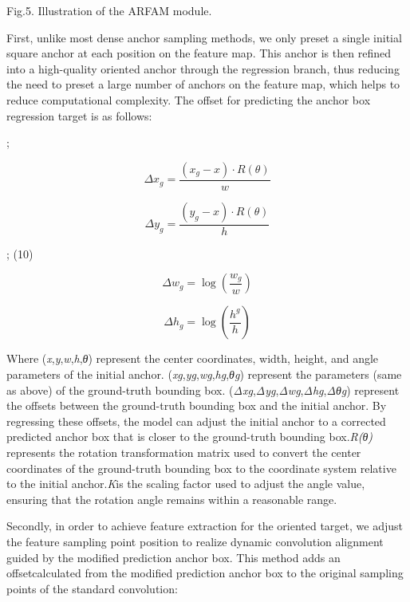 \documentclass[journal]{IEEEtran}
\begin{document}
Fig.5. Illustration of the ARFAM module.

First, unlike most dense anchor sampling methods, we only preset a single initial square anchor at each position on the feature map. This anchor is then refined into a high-quality oriented anchor through the regression branch, thus reducing the need to preset a large number of anchors on the feature map, which helps to reduce computational complexity. The offset for predicting the anchor box regression target is as follows:

 ; 

\begin{equation}
\Delta x_g = \frac{(x_g - x) \cdot R(\theta)}{w}
\label{eq:eq_33}
\end{equation}

\begin{equation}
\Delta y_g = \frac{(y_g - x) \cdot R(\theta)}{h}
\label{eq:eq_34}
\end{equation}

 ; 	(10)

\begin{equation}
\Delta w_g = \log\left( \frac{w_g}{w} \right)
\label{eq:eq_35}
\end{equation}

\begin{equation}
\Delta h_g = \log\left( \frac{h^g}{h} \right)
\label{eq:eq_36}
\end{equation}

	Where (\textit{x},\textit{y},\textit{w},\textit{h},\textit{θ}) represent the center coordinates, width, height, and angle parameters of the initial anchor. (\textit{x}\textit{g},\textit{y}\textit{g},\textit{w}\textit{g},\textit{h}\textit{g},\textit{θ}\textit{g}) represent the parameters (same as above) of the ground-truth bounding box. (\textit{Δx}\textit{g},\textit{Δy}\textit{g},\textit{Δw}\textit{g},\textit{Δh}\textit{g},\textit{Δθ}\textit{g}) represent the offsets between the ground-truth bounding box and the initial anchor. By regressing these offsets, the model can adjust the initial anchor to a corrected predicted anchor box that is closer to the ground-truth bounding box.\textit{R(θ)} represents the rotation transformation matrix used to convert the center coordinates of the ground-truth bounding box to the coordinate system relative to the initial anchor.\textit{K}is the scaling factor used to adjust the angle value, ensuring that the rotation angle remains within a reasonable range.

	Secondly, in order to achieve feature extraction for the oriented target, we adjust the feature sampling point position to realize dynamic convolution alignment guided by the modified prediction anchor box. This method adds an offsetcalculated from the modified prediction anchor box to the original sampling points of the standard convolution:
\end{document}
